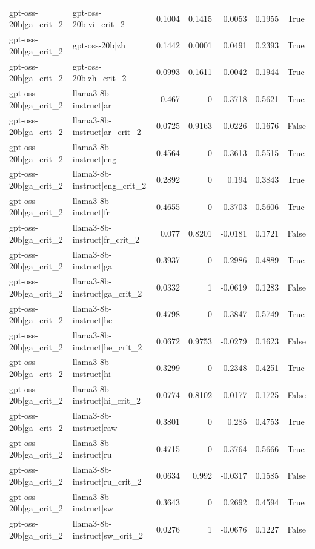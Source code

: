 \begin{table}
\begin{tabular}{l l r r r r l}
gpt-oss-20b|ga_crit_2 & gpt-oss-20b|vi_crit_2 & 0.1004 & 0.1415 & 0.0053 & 0.1955 & True \\
gpt-oss-20b|ga_crit_2 & gpt-oss-20b|zh & 0.1442 & 0.0001 & 0.0491 & 0.2393 & True \\
gpt-oss-20b|ga_crit_2 & gpt-oss-20b|zh_crit_2 & 0.0993 & 0.1611 & 0.0042 & 0.1944 & True \\
gpt-oss-20b|ga_crit_2 & llama3-8b-instruct|ar & 0.467 & 0 & 0.3718 & 0.5621 & True \\
gpt-oss-20b|ga_crit_2 & llama3-8b-instruct|ar_crit_2 & 0.0725 & 0.9163 & -0.0226 & 0.1676 & False \\
gpt-oss-20b|ga_crit_2 & llama3-8b-instruct|eng & 0.4564 & 0 & 0.3613 & 0.5515 & True \\
gpt-oss-20b|ga_crit_2 & llama3-8b-instruct|eng_crit_2 & 0.2892 & 0 & 0.194 & 0.3843 & True \\
gpt-oss-20b|ga_crit_2 & llama3-8b-instruct|fr & 0.4655 & 0 & 0.3703 & 0.5606 & True \\
gpt-oss-20b|ga_crit_2 & llama3-8b-instruct|fr_crit_2 & 0.077 & 0.8201 & -0.0181 & 0.1721 & False \\
gpt-oss-20b|ga_crit_2 & llama3-8b-instruct|ga & 0.3937 & 0 & 0.2986 & 0.4889 & True \\
gpt-oss-20b|ga_crit_2 & llama3-8b-instruct|ga_crit_2 & 0.0332 & 1 & -0.0619 & 0.1283 & False \\
gpt-oss-20b|ga_crit_2 & llama3-8b-instruct|he & 0.4798 & 0 & 0.3847 & 0.5749 & True \\
gpt-oss-20b|ga_crit_2 & llama3-8b-instruct|he_crit_2 & 0.0672 & 0.9753 & -0.0279 & 0.1623 & False \\
gpt-oss-20b|ga_crit_2 & llama3-8b-instruct|hi & 0.3299 & 0 & 0.2348 & 0.4251 & True \\
gpt-oss-20b|ga_crit_2 & llama3-8b-instruct|hi_crit_2 & 0.0774 & 0.8102 & -0.0177 & 0.1725 & False \\
gpt-oss-20b|ga_crit_2 & llama3-8b-instruct|raw & 0.3801 & 0 & 0.285 & 0.4753 & True \\
gpt-oss-20b|ga_crit_2 & llama3-8b-instruct|ru & 0.4715 & 0 & 0.3764 & 0.5666 & True \\
gpt-oss-20b|ga_crit_2 & llama3-8b-instruct|ru_crit_2 & 0.0634 & 0.992 & -0.0317 & 0.1585 & False \\
gpt-oss-20b|ga_crit_2 & llama3-8b-instruct|sw & 0.3643 & 0 & 0.2692 & 0.4594 & True \\
gpt-oss-20b|ga_crit_2 & llama3-8b-instruct|sw_crit_2 & 0.0276 & 1 & -0.0676 & 0.1227 & False \\

\end{tabular}
\end{table}
